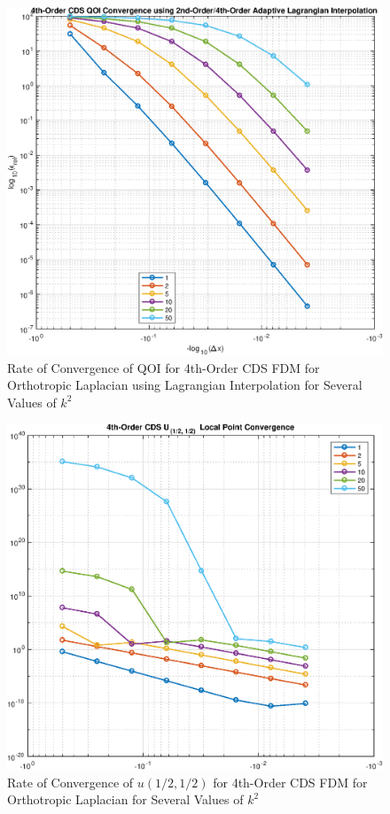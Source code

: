 \documentclass[10pt]{article}		%
\numberwithin{equation}{section}
\begin{document}
\begin{table}[H]
	
\end{table}

\begin{figure}[H]
	\begin{center}
		\includegraphics[width = 0.8\linewidth]{order_4_u_y_lag}
		\caption{Rate of Convergence of QOI for 4th-Order CDS FDM for Orthotropic Laplacian using Lagrangian Interpolation for Several Values of $k^2$}	
	\end{center}
\end{figure}

\begin{table}[H]
	
\end{table}

\begin{figure}[H]
	\begin{center}
		\includegraphics[width = 0.8\linewidth]{order_4_u_avg}
		\caption{Rate of Convergence of $u(1/2, 1/2)$ for 4th-Order CDS FDM for Orthotropic Laplacian for Several Values of $k^2$}	
	\end{center}
\end{figure}
\end{document}
